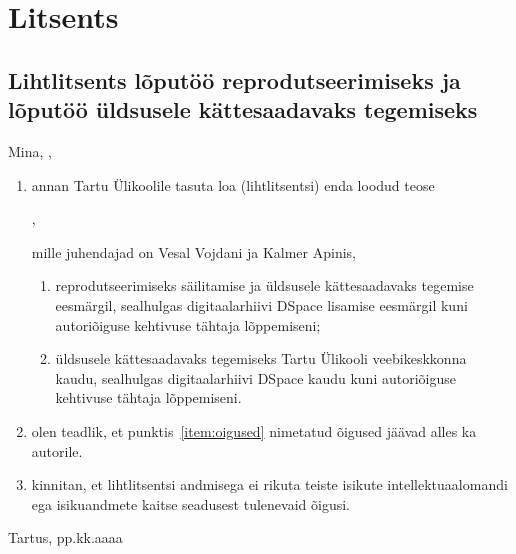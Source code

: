 \documentclass[../thesis.tex]{subfiles}
\begin{document}
\section{Litsents}

\subsection*{Lihtlitsents lõputöö reprodutseerimiseks ja lõputöö üldsusele kättesaadavaks tegemiseks}

Mina, \textbf{\myauthor},

\begin{enumerate}
	\item \label{item:oigused} annan Tartu Ülikoolile tasuta loa (lihtlitsentsi) enda loodud teose

	\textbf{\mytitle},

	mille juhendajad on Vesal Vojdani ja Kalmer Apinis,

	\begin{enumerate}[label*=\arabic*.] %
		\item reprodutseerimiseks säilitamise ja üldsusele kättesaadavaks tegemise eesmärgil, sealhulgas digitaalarhiivi DSpace lisamise eesmärgil kuni autoriõiguse kehtivuse tähtaja lõppemiseni;

		\item üldsusele kättesaadavaks tegemiseks Tartu Ülikooli veebikeskkonna kaudu, sealhulgas digitaalarhiivi DSpace kaudu kuni autoriõiguse kehtivuse tähtaja lõppemiseni.
	\end{enumerate}

	\item olen teadlik, et punktis~\ref{item:oigused} nimetatud õigused jäävad alles ka autorile.

	\item kinnitan, et lihtlitsentsi andmisega ei rikuta teiste isikute intellektuaalomandi ega isikuandmete kaitse seadusest tulenevaid õigusi. 
\end{enumerate}

\noindent
Tartus, pp.kk.aaaa
\end{document}
